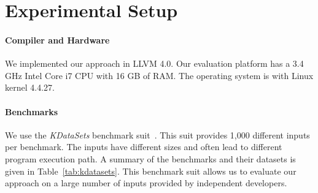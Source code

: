 \section{Experimental Setup}
\paragraph{Compiler and Hardware} We implemented our approach in LLVM 4.0. Our evaluation platform has a  3.4 GHz Intel Core i7 CPU with 16 GB of RAM. The
operating system is  with Linux kernel 4.4.27.


\paragraph{Benchmarks}
We use the \textit{KDataSets} benchmark suit~\cite{chen10,chen12a}. This suit provides 1,000 different inputs per benchmark. The inputs
have different sizes and often lead to different program execution path. A summary of the benchmarks and their datasets is given in
Table~\ref{tab:kdatasets}. This benchmark suit allows us to evaluate our approach on a large number of inputs provided by independent
developers.

\begin{table*}[t]
\centering
\scriptsize
{}
\caption{Training benchmarks and their inputs}
\label{tab:kdatasets:training}
\end{table*}

